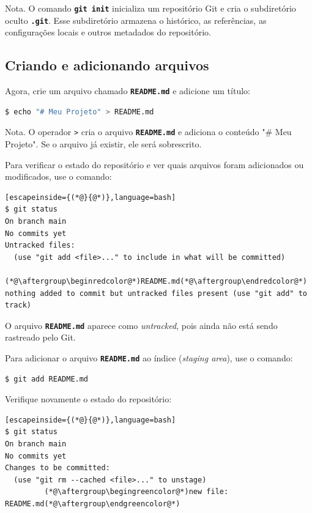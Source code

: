 \documentclass[12pt,a4paper]{article}
\begin{document}
\begin{question}{Nota.}
\footnotesize O comando \textbf{\texttt{git init}} inicializa um repositório Git e cria o subdiretório oculto \textbf{\texttt{.git}}. Esse subdiretório armazena o histórico, as referências, as configurações locais e outros metadados do repositório.
\end{question}

\subsection{Criando e adicionando arquivos}

Agora, crie um arquivo chamado \textbf{\texttt{README.md}} e adicione um título:

\begin{lstlisting}[language=bash]
$ echo "# Meu Projeto" > README.md
\end{lstlisting}

\begin{question}{Nota.}
\footnotesize O operador \texttt{>} cria o arquivo \textbf{\texttt{README.md}} e adiciona o conteúdo "\# Meu Projeto". Se o arquivo já existir, ele será sobrescrito.
\end{question}

Para verificar o estado do repositório e ver quais arquivos foram adicionados ou modificados, use o comando:

\begin{lstlisting}[escapeinside={(*@}{@*)},language=bash]
$ git status
On branch main
No commits yet
Untracked files:
  (use "git add <file>..." to include in what will be committed)
         (*@\aftergroup\beginredcolor@*)README.md(*@\aftergroup\endredcolor@*)
nothing added to commit but untracked files present (use "git add" to track)
\end{lstlisting}

O arquivo \textbf{\texttt{README.md}} aparece como \textit{untracked}, pois ainda não está sendo rastreado pelo Git.

Para adicionar o arquivo \textbf{\texttt{README.md}} ao índice (\textit{staging area}), use o comando:

\begin{lstlisting}[language=bash]
$ git add README.md
\end{lstlisting}

Verifique novamente o estado do repositório:

\begin{lstlisting}[escapeinside={(*@}{@*)},language=bash]
$ git status
On branch main
No commits yet
Changes to be committed:
  (use "git rm --cached <file>..." to unstage)
         (*@\aftergroup\begingreencolor@*)new file:   README.md(*@\aftergroup\endgreencolor@*)
\end{lstlisting}
\end{document}
